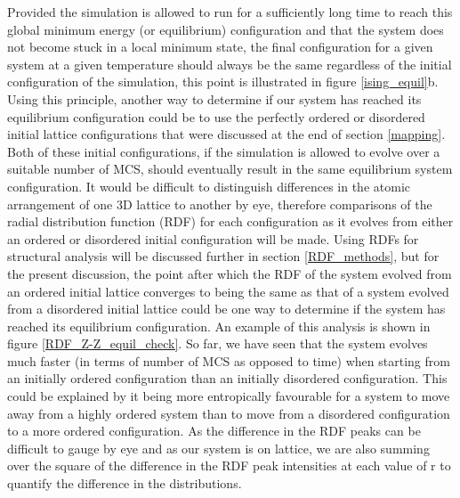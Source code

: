 Provided the simulation is allowed to run for a sufficiently long time to reach this global minimum energy (or equilibrium) configuration and that the system does not become stuck in a local minimum state, the final configuration for a given system at a given temperature should always be the same regardless of the initial configuration of the simulation, this point is illustrated in figure \ref{ising_equil}b. Using this principle, another way to determine if our system has reached its equilibrium configuration could be to use the perfectly ordered or disordered initial lattice configurations that were discussed at the end of section \ref{mapping}. Both of these initial configurations, if the simulation is allowed to evolve over a suitable number of MCS, should eventually result in the same equilibrium system configuration. It would be difficult to distinguish differences in the atomic arrangement of one 3D lattice to another by eye, therefore comparisons of the radial distribution function (RDF) for each configuration as it evolves from either an ordered or disordered initial configuration will be made. Using RDFs for structural analysis will be discussed further in section \ref{RDF_methods}, but for the present discussion, the point after which the RDF of the system evolved from an ordered initial lattice converges to being the same as that of a system evolved from a disordered initial lattice could be one way to determine if the system has reached its equilibrium configuration. An example of this analysis is shown in figure \ref{RDF_Z-Z_equil_check}. So far, we have seen that the system evolves much faster (in terms of number of MCS as opposed to time) when starting from an initially ordered configuration than an initially disordered configuration. This could be explained by it being more entropically favourable for a system to move away from a highly ordered system than to move from a disordered configuration to a more ordered configuration. As the difference in the RDF peaks can be difficult to gauge by eye and as our system is on lattice, we are also summing over the square of the difference in the RDF peak intensities at each value of r to quantify the difference in the distributions.

